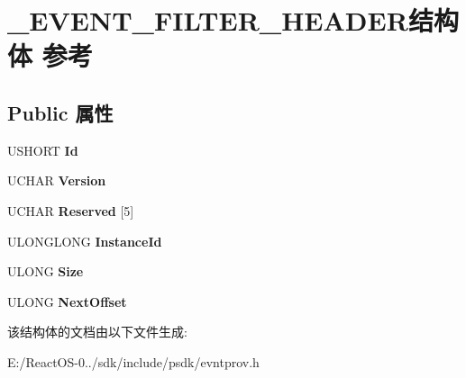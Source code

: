 \hypertarget{struct___e_v_e_n_t___f_i_l_t_e_r___h_e_a_d_e_r}{}\section{\+\_\+\+E\+V\+E\+N\+T\+\_\+\+F\+I\+L\+T\+E\+R\+\_\+\+H\+E\+A\+D\+E\+R结构体 参考}
\label{struct___e_v_e_n_t___f_i_l_t_e_r___h_e_a_d_e_r}
\subsection*{Public 属性}
\begin{DoxyCompactItemize}
\item 
\mbox{\label{struct___e_v_e_n_t___f_i_l_t_e_r___h_e_a_d_e_r_ac1a1124819e25d8725048be297ec331c}} 
U\+S\+H\+O\+RT {\bfseries Id}
\item 
\mbox{\label{struct___e_v_e_n_t___f_i_l_t_e_r___h_e_a_d_e_r_a77b1a4c991b7ae023ee3fcb8ceb0e309}} 
U\+C\+H\+AR {\bfseries Version}
\item 
\mbox{\label{struct___e_v_e_n_t___f_i_l_t_e_r___h_e_a_d_e_r_a0d63b42ee5829794a92f6a2dc8fad417}} 
U\+C\+H\+AR {\bfseries Reserved} \mbox{[}5\mbox{]}
\item 
\mbox{\label{struct___e_v_e_n_t___f_i_l_t_e_r___h_e_a_d_e_r_a2a06bc403bfd6bcd6d8297c3a83ec846}} 
U\+L\+O\+N\+G\+L\+O\+NG {\bfseries Instance\+Id}
\item 
\mbox{\label{struct___e_v_e_n_t___f_i_l_t_e_r___h_e_a_d_e_r_a8dcc83295510193acd091f3795bfd924}} 
U\+L\+O\+NG {\bfseries Size}
\item 
\mbox{\label{struct___e_v_e_n_t___f_i_l_t_e_r___h_e_a_d_e_r_afa986adfa32b1b92489df7ab1db14675}} 
U\+L\+O\+NG {\bfseries Next\+Offset}
\end{DoxyCompactItemize}


该结构体的文档由以下文件生成\+:\begin{DoxyCompactItemize}
\item 
E\+:/\+React\+O\+S-\/0../sdk/include/psdk/evntprov.\+h\end{DoxyCompactItemize}
